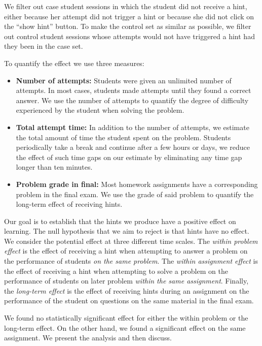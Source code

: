 \documentclass{llncs2e/llncs}
\begin{document}
We filter out case student sessions in which the student did not
receive a hint, either because her attempt did not trigger a hint or
because she did not click on the ``show hint'' button.  To make the
control set as similar as possible, we filter out control student
sessions whose attempts would not have triggered a hint had they been
in the case set.

To quantify the effect we use three measures:
\begin{itemize}
\item {\bf Number of attempts:} Students were given an unlimited number of attempts. In most cases, students made attempts until they found a correct answer. We use the number of attempts to quantify the degree of difficulty experienced by the student when solving the problem.

\item {\bf Total attempt time:} In addition to the number of attempts, we estimate the total amount of time the student spent on the problem. Students periodically take a break and continue after a few hours or days, we reduce the effect of such time gaps on our estimate by eliminating any time gap longer than ten minutes.

\item {\bf Problem grade in final:} Most homework assignments have a corresponding problem in the final exam. We use the grade of said problem to quantify the long-term effect of receiving hints. 
\end{itemize}

Our goal is to establish that the hints we produce have a positive effect on learning. The null hypothesis that we aim to reject is that hints have no effect. We consider the potential effect at three different time scales. The {\em within problem effect} is the effect of receiving a hint when attempting to answer a problem on the performance of students {\em on the same problem}. The {\em within assignment effect} is the effect of receiving a hint when attempting to solve a problem on the performance of students on later problem {\em within the same assignment}. Finally, the {\em long-term effect} is the effect of receiving hints during an assignment on the performance of the student on questions on the same material in the final exam.

We found no statistically significant effect for either the within problem or the long-term effect. On the other hand, we found a significant effect on the same assignment. We present the analysis and then discuss.
\end{document}
